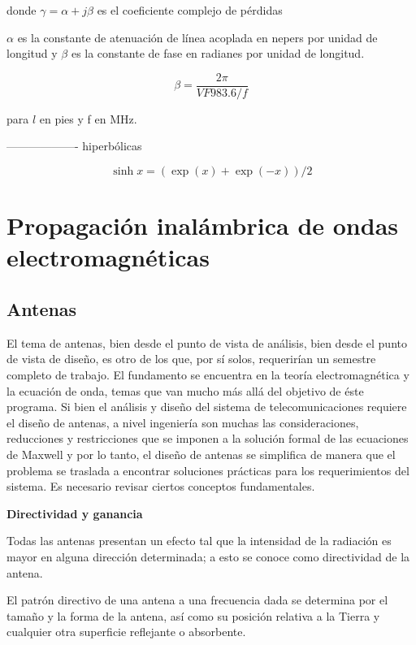 \documentclass[12pt,letterpaper,titlepage,twoside]{book}
\begin{document}
donde $\gamma = \alpha +j \beta$ es el coeficiente complejo de pérdidas

$\alpha$ es la constante de atenuación de línea acoplada en nepers por unidad de longitud y $\beta$ es la constante de fase en radianes por unidad de longitud.

\begin{equation}
\beta = \frac{2 \pi}{VF 983.6/f} 
\end{equation}

para $l$ en pies y f en MHz.


-------------------
hiperbólicas

\begin{equation}
\sinh x = (\exp(x) + \exp(-x))/2 
\end{equation}



\section{Propagación inalámbrica de ondas electromagnéticas}
\subsection{Antenas}
El tema de antenas, bien desde el punto de vista de análisis, bien desde el punto de vista de diseño, es otro de los que, por sí solos, requerirían un semestre completo de trabajo. El fundamento se encuentra en la teoría electromagnética y la ecuación de onda, temas que van mucho más allá del objetivo de éste programa. Si bien el análisis  y diseño del sistema de telecomunicaciones requiere el diseño de antenas, a nivel ingeniería son muchas las consideraciones, reducciones y restricciones que se imponen a la solución formal de las ecuaciones de Maxwell y por lo tanto, el diseño de antenas se simplifica de manera que el problema se traslada a encontrar soluciones prácticas para los requerimientos del sistema. Es necesario revisar ciertos conceptos fundamentales.

\textbf{Directividad y ganancia}

Todas las antenas presentan un efecto tal que la intensidad de la radiación  es mayor en alguna dirección determinada; a esto se conoce como directividad de la antena.

El patrón directivo de una antena a una frecuencia dada se determina por el tamaño y la forma de la antena, así como su posición relativa a la Tierra y cualquier otra superficie reflejante o absorbente. 
\end{document}
